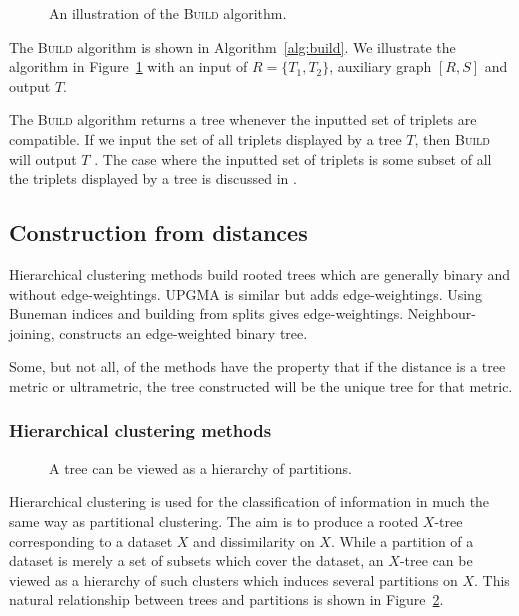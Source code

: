 \begin{figure}
  \centering
  
  \caption{An illustration of the \textsc{Build} algorithm.}
  \label{fig:build-ex}
\end{figure}

The \textsc{Build} algorithm is shown in Algorithm~\ref{alg:build}.  We
illustrate the algorithm in Figure~\ref{fig:build-ex} with an input of $R =
\{T_1,T_2\}$, auxiliary graph $[R,S]$ and output $T$.

The \textsc{Build} algorithm returns a tree whenever the inputted set of
triplets are compatible.  If we input the set of all triplets displayed by a
tree $T$, then \textsc{Build} will output $T$ \cite{semple2003phylogenetics}.
The case where the inputted set of triplets is some subset of all the triplets
displayed by a tree is discussed in \cite[Section 2.5.2]{bryant97buildingtrees}.

\subsection{Construction from distances}
\label{sec:constr-from-dist}

Hierarchical clustering methods build rooted trees which are generally binary
and without edge-weightings.  UPGMA is similar but adds edge-weightings.
Using Buneman indices and building from splits gives edge-weightings.
Neighbour-joining, constructs an edge-weighted binary tree.

Some, but not all, of the methods have the property that if the distance is a
tree metric or ultrametric, the tree constructed will be the unique tree for
that metric.

\subsubsection{Hierarchical clustering methods}
\label{sec:hier-clust-meth}

\begin{figure}
  \centering
  
  \caption{A tree can be viewed as a hierarchy of partitions.}
  \label{fig:tree-clust-ex}
\end{figure}

Hierarchical clustering is used for the classification of information in much
the same way as partitional clustering.  The aim is to produce a rooted
$X$-tree corresponding to a dataset $X$ and dissimilarity on $X$.  While a
partition of a dataset is merely a set of subsets which cover the dataset, an
$X$-tree can be viewed as a hierarchy of such clusters which induces several
partitions on $X$.  This natural relationship between trees and partitions is
shown in Figure~\ref{fig:tree-clust-ex}.


